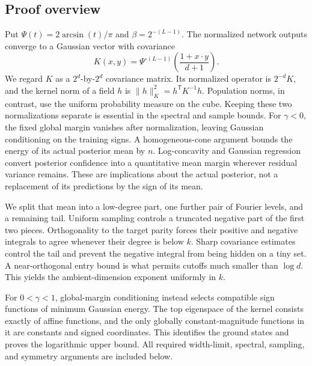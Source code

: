\documentclass[11pt]{article}
\theoremstyle{remark}\newtheorem{remark}[theorem]{Remark}
\begin{document}
\subsection{Proof overview}
Put $\Psi(t)=2\arcsin(t)/\pi$ and $\beta=2^{-(L-1)}$.
The normalized network outputs converge to a Gaussian vector with
covariance
\[
 K(x,y)=\Psi^{\circ(L-1)}\!\left(\frac{1+x\cdot y}{d+1}\right).
\]
We regard $K$ as a $2^d$-by-$2^d$ covariance matrix. Its normalized
operator is $2^{-d}K$, and the kernel norm of a field $h$ is
$\|h\|_K^2=h^{\mathsf T}K^{-1}h$. Population norms, in contrast,
use the uniform probability measure on the cube. Keeping these two
normalizations separate is essential in the spectral and sample bounds.
For $\gamma<0$, the fixed global margin vanishes after normalization,
leaving Gaussian conditioning on the training signs. A homogeneous-cone
argument bounds the energy of its actual posterior mean by $n$.
Log-concavity and Gaussian regression convert posterior confidence
into a quantitative mean margin wherever residual variance remains.
These are implications about the actual posterior, not a replacement
of its predictions by the sign of its mean.

We split that mean into a low-degree part, one further pair of Fourier
levels, and a remaining tail. Uniform sampling controls a truncated
negative part of the first two pieces. Orthogonality to the target
parity forces their positive and negative integrals to agree whenever
their degree is below $k$. Sharp covariance estimates control the tail
and prevent the negative integral from being hidden on a tiny set.
A near-orthogonal entry bound is what permits cutoffs much smaller than
$\log d$. This yields the ambient-dimension exponent uniformly in $k$.

For $0<\gamma<1$, global-margin conditioning instead selects compatible
sign functions of minimum Gaussian energy. The top eigenspace of the
kernel consists exactly of affine functions, and the only globally
constant-magnitude functions in it are constants and signed coordinates.
This identifies the ground states and proves the logarithmic upper bound.
All required width-limit, spectral, sampling, and symmetry arguments are
included below.










\end{document}
